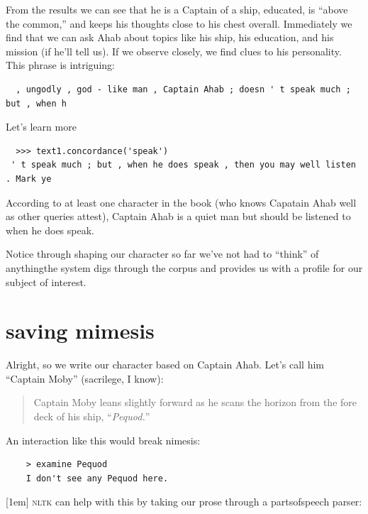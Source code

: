 From the results we can see that he is a Captain of a ship, educated, is ``above
the common,'' and keeps his thoughts close to his chest overall. Immediately we
find that we can ask Ahab about topics like his ship, his education, and his mission (if he'll
tell us). If we observe closely, we find clues to his personality. This phrase
is intriguing:
\begin{lstlisting}
  , ungodly , god - like man , Captain Ahab ; doesn ' t speak much ; but , when h
\end{lstlisting}

Let's learn more

\begin{lstlisting}
  >>> text1.concordance('speak')
 ' t speak much ; but , when he does speak , then you may well listen . Mark ye
\end{lstlisting}
According to at least one character in the book (who knows Capatain Ahab well as
other queries attest), Captain Ahab is a quiet man but should be listened to
when he does speak.

Notice through shaping our character so far we've not had to ``think'' of
anything\textemdash the system digs through the corpus and provides us with a profile for
our subject of interest.


\section{saving mimesis}
Alright, so we write our character based on Captain Ahab. Let's call him
``Captain Moby'' (sacrilege, I know):
\begin{quote}
Captain Moby leans slightly forward as he scans the horizon from the fore deck
of his ship, ``\textit{Pequod.}'' 
\end{quote}
  An interaction like this would break nimesis:
  \begin{lstlisting}
    > examine Pequod
    I don't see any Pequod here.
  \end{lstlisting}
[1em]
\textsc{nltk} can help with this by taking our prose through a parts\textendash of\textendash speech parser:

